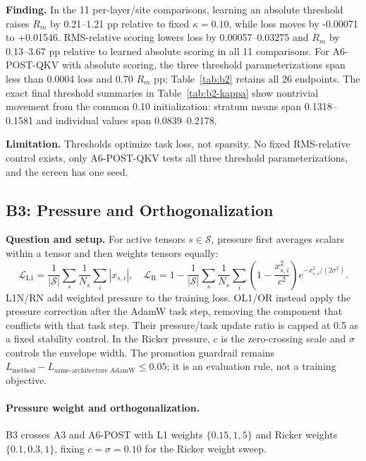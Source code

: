 \documentclass[10pt]{article}
\begin{document}


\textbf{Finding.} In the 11 per-layer/site comparisons, learning an absolute
threshold raises \(R_m\) by 0.21--1.21 pp relative to fixed \(\kappa=0.10\),
while loss moves by -0.00071 to +0.01546. RMS-relative scoring lowers loss by
0.00057--0.03275 and \(R_m\) by 0.13--3.67 pp relative to learned absolute
scoring in all 11 comparisons. For A6-POST-QKV with absolute scoring, the three
threshold parameterizations span less than 0.0004 loss and 0.70 \(R_m\) pp;
Table~\ref{tab:b2} retains all 26 endpoints. The exact final threshold
summaries in Table~\ref{tab:b2-kappa} show nontrivial movement from the common
0.10 initialization: stratum means span 0.1318--0.1581 and individual values
span 0.0839--0.2178.

\textbf{Limitation.} Thresholds optimize task loss, not sparsity. No fixed
RMS-relative control exists, only A6-POST-QKV tests all three threshold
parameterizations, and the screen has one seed.

\FloatBarrier
\subsection{B3: Pressure and Orthogonalization}

\textbf{Question and setup.} For active tensors \(s\in\mathcal S\), pressure
first averages scalars within a tensor and then weights tensors equally:
\[
\mathcal L_{\mathrm{L1}}=\frac1{|\mathcal S|}\sum_s\frac1{N_s}\sum_i|x_{s,i}|,
\quad
\mathcal L_{\mathrm R}=1-\frac1{|\mathcal S|}\sum_s\frac1{N_s}\sum_i
\left(1-\frac{x_{s,i}^2}{c^2}\right)e^{-x_{s,i}^2/(2\sigma^2)}.
\]
L1N/RN add weighted pressure to the training loss. OL1/OR instead apply the
pressure correction after the AdamW task step, removing the component that
conflicts with that task step. Their pressure/task update ratio is capped at
0.5 as a fixed stability control. In the Ricker pressure, \(c\) is the
zero-crossing scale and \(\sigma\) controls the envelope width. The promotion
guardrail remains
\(L_{\mathrm{method}}-L_{\text{same-architecture AdamW}}\le0.05\); it is an
evaluation rule, not a training objective.

\paragraph{Pressure weight and orthogonalization.}
B3 crosses A3 and A6-POST with L1 weights \(\{0.15,1,5\}\) and Ricker weights
\(\{0.1,0.3,1\}\), fixing \(c=\sigma=0.10\) for the Ricker weight sweep.
\end{document}
